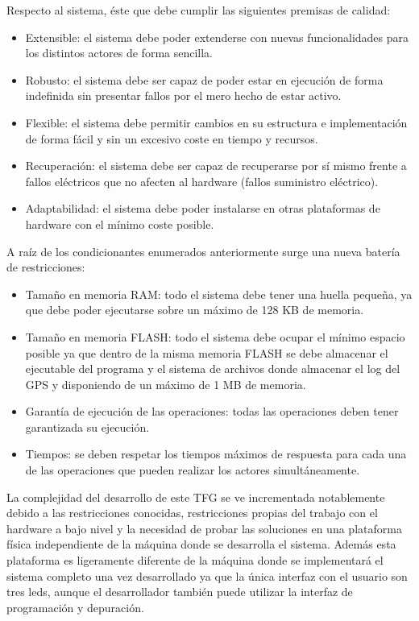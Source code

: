 Respecto al sistema, éste que debe cumplir las siguientes premisas de calidad:
\begin{itemize}
\item Extensible: el sistema debe poder extenderse con nuevas funcionalidades para los distintos actores de forma sencilla. 
\item Robusto: el sistema debe ser capaz de poder estar en ejecución de forma indefinida sin presentar fallos por el mero hecho de estar activo. 
\item Flexible: el sistema debe permitir cambios en su estructura e implementación de forma fácil y sin un excesivo coste en tiempo y recursos. 
\item Recuperación: el sistema debe ser capaz de recuperarse por sí mismo frente a fallos eléctricos que no afecten al hardware (fallos suministro eléctrico). 
\item Adaptabilidad: el sistema debe poder instalarse en otras plataformas de hardware con el mínimo coste posible. \\
\end{itemize}

A raíz de los condicionantes enumerados anteriormente surge una nueva batería de restricciones:
\begin{itemize}
\item Tamaño en memoria RAM: todo el sistema debe tener una huella pequeña, ya que debe poder ejecutarse sobre un máximo de 128 KB de memoria.
\item Tamaño en memoria FLASH: todo el sistema debe ocupar el mínimo espacio posible ya que dentro de la misma memoria FLASH se debe almacenar el ejecutable del programa y el sistema de archivos donde almacenar el log del GPS y disponiendo de un máximo de 1 MB de memoria.
\item Garantía de ejecución de las operaciones: todas las operaciones deben tener garantizada su ejecución.
\item Tiempos: se deben respetar los tiempos máximos de respuesta para cada una de las operaciones que pueden realizar los actores simultáneamente.\\
\end{itemize}

La complejidad del desarrollo de este \acs{TFG} se ve incrementada notablemente debido a las restricciones conocidas, restricciones propias del trabajo con el hardware a bajo nivel y la necesidad de probar las soluciones en una plataforma física independiente de la máquina donde se desarrolla el sistema. Además esta plataforma es ligeramente diferente de la máquina donde se implementará el sistema completo una vez desarrollado ya que la única interfaz con el usuario son tres leds, aunque el desarrollador también puede utilizar la interfaz de programación y depuración.\\

